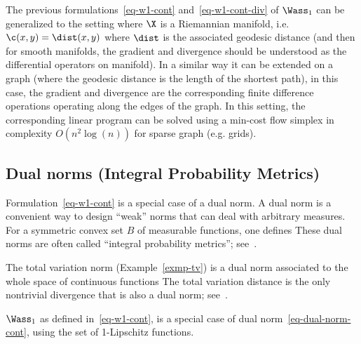 The previous formulations~\eqref{eq-w1-cont} and~\eqref{eq-w1-cont-div} of $\Wass_1$ can be generalized to the setting where $\X$ is a Riemannian  manifold, i.e. $\c(x,y)=\dist(x,y)$ where $\dist$ is the associated geodesic distance (and then for smooth manifolds, the gradient and divergence should be understood as the differential operators on manifold). In a similar way it can be extended on a graph (where the geodesic distance is the length of the shortest path), in this case, the gradient and divergence are the corresponding finite difference operations operating along the edges of the graph. In this setting, the corresponding linear program can be solved using a min-cost flow simplex in complexity $O(n^2 \log(n))$ for sparse graph (e.g. grids). 


\subsection{Dual norms (Integral Probability Metrics)}
\label{sec-dual-norms}

Formulation~\eqref{eq-w1-cont} is a special case of a dual norm. A dual norm is a convenient way to design ``weak'' norms that can deal with arbitrary measures. For a symmetric convex set $B$ of measurable functions, one defines 
These dual norms are often called ``integral probability metrics''; see~\cite{sriperumbudur2012empirical}.


\begin{example}
The total variation norm (Example~\ref{exmp-tv}) is a dual norm associated to the whole space of continuous functions
The total variation distance is the only nontrivial divergence that is also a dual norm; see~\cite{sriperumbudur2009integral}. 
\end{example}

\begin{example}
$\Wass_1$ as defined in~\eqref{eq-w1-cont}, is a special case of dual norm~\eqref{eq-dual-norm-cont}, using
the set of 1-Lipschitz functions.
\end{example}

